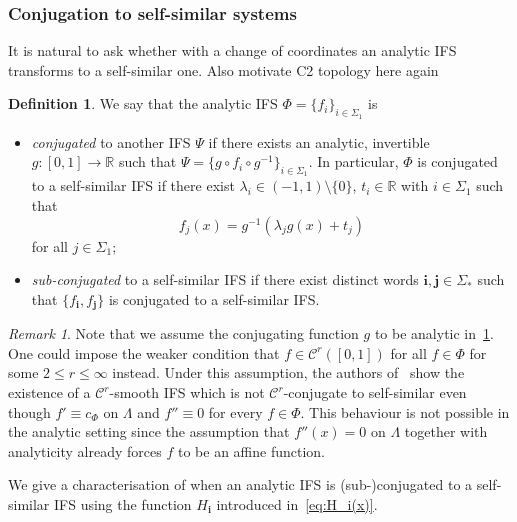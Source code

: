 \documentclass[12pt,]{article}
\def\cref#1{\ref{#1}}%
\theoremstyle{definition}
\newtheorem{definition}[theorem]{Definition}
\theoremstyle{remark}
\newtheorem{remark}[theorem]{Remark}
\renewcommand{\Bbb}[1]{\mathbb{#1}}
\newcommand{\bbR}{{\Bbb R}}        %
\newcommand{\0}{\mathbf{0}}
\newcommand{\bi}{\mathbf{i}}
\newcommand{\bj}{\mathbf{j}}
\begin{document}
{%

\subsubsection{Conjugation to self-similar systems}\label{sec:ConjLinSys}

It is natural to ask whether with a change of coordinates an analytic IFS transforms to a self-similar one.
{\color{red} Also motivate C2 topology here again}

\begin{definition}\label{def:conjugation}
We say that the analytic IFS $\Phi = \{f_i\}_{i\in\Sigma_1}$ is 
\begin{itemize}
\item \emph{conjugated} to another IFS $\Psi$ if there exists an analytic, invertible
  $g:[0,1]\to\bbR$ such that $\Psi=\{g\circ f_i\circ g^{-1}\}_{i\in\Sigma_1}$. In particular, $\Phi$
  is conjugated to a self-similar IFS if there exist $\lambda_i
\in(-1,1)\setminus\{0\}$, $t_i\in\bbR$ with $i\in\Sigma_1$ such that
\[
f_{j}(x) = g^{-1}(\lambda_j g(x) + t_j)
\]
for all $j\in\Sigma_1$;
\item \emph{sub-conjugated} to a self-similar IFS if there exist distinct words $\bi,\bj\in\Sigma_*$ such that
$\{f_{\bi},f_{\bj}\}$ is conjugated to a self-similar IFS.
\end{itemize}
\end{definition}

\begin{remark}
Note that we assume the conjugating function $g$ to be analytic in~\cref{def:conjugation}. One could
impose the weaker condition that $f\in\mathcal{C}^r([0,1])$ for all $f\in\Phi$ for some $2\leq r\leq
\infty$ instead. Under this assumption, the authors of~\cite{AlgomEtal_NonLinHyperbolicIFS} show the
existence of a $\mathcal{C}^r$-smooth IFS which is not $\mathcal{C}^r$-conjugate to self-similar
even though $f'\equiv c_{\Phi}$ on $\Lambda$ and $f''\equiv 0$ for every $f\in\Phi$. This behaviour
is not possible in the analytic setting since the assumption that $f''(x)=0$ on $\Lambda$ together
with analyticity already forces $f$ to be an affine function. 
\end{remark}

We give a characterisation of when an analytic IFS is (sub-)conjugated to a self-similar IFS using
the function $H_{\bi}$ introduced in~\cref{eq:H_i(x)}.

}
\end{document}
